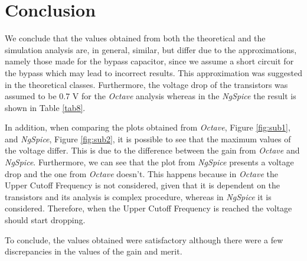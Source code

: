 \section{Conclusion}
\label{sec:conclusion}

We conclude that the values obtained from both the theoretical and the simulation analysis are, in general, similar, but differ due to the approximations, namely those made for the bypass capacitor, since we assume a short circuit for the bypass which may lead to incorrect results. This approximation was suggested in the theoretical classes. Furthermore, the voltage drop of the transistors was assumed to be 0.7 V for the \emph{Octave} analysis whereas in the \emph{NgSpice} the result is shown in Table \ref{tab8}.

In addition, when comparing the plots obtained from \emph{Octave}, Figure \ref{fig:sub1}, and \emph{NgSpice}, Figure \ref{fig:sub2}, it is possible to see that the maximum values of the voltage differ. This is due to the difference between the gain from \emph{Octave} and \emph{NgSpice}. Furthermore, we can see that the plot from \emph{NgSpice} presents a voltage drop and the one from \emph{Octave} doesn't. This happens because in \emph{Octave} the Upper Cutoff Frequency is not considered, given that it is dependent on the transistors and its analysis is complex procedure, whereas in \emph{NgSpice} it is considered. Therefore, when the Upper Cutoff Frequency is reached the voltage should start dropping.

To conclude, the values obtained were satisfactory although there were a few discrepancies in the values of the gain and merit.
